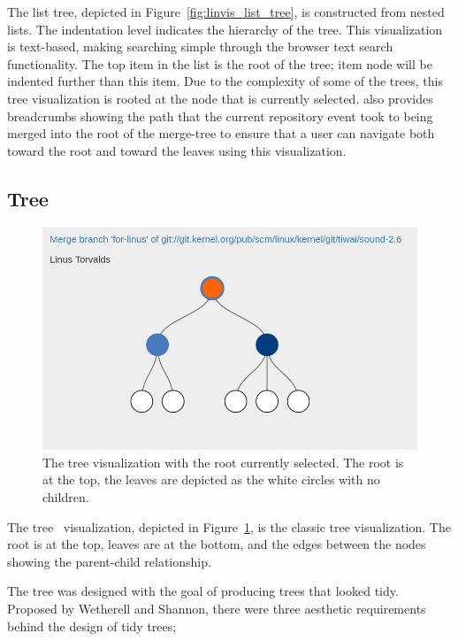 The list tree, depicted in Figure~\ref{fig:linvis_list_tree}, is
constructed from nested lists. The indentation level indicates the
hierarchy of the tree. This visualization is text-based, making
searching simple through the browser text search functionality. The top
item in the list is the root of the tree; item node will be indented
further than this item. Due to the complexity of some of the trees, this
tree visualization is rooted at the node that is currently selected.
\tool{} also provides breadcrumbs showing the path that the current
repository event took to being merged into the root of the merge-tree to
ensure that a user can navigate both toward the root and toward the
leaves using this visualization.

\subsection{\rt{} Tree}
\label{sub:rt_tree}

\begin{figure}[htpb]
  \centering
  \includegraphics[width=0.9\linewidth]{Figures/Linvis/linvis_reingold_tree.png}
  \caption{The \rt{} tree visualization with the root currently
    selected. The root is at the top, the leaves are depicted as the
    white circles with no children.}
  \label{fig:linvis_reingold_tree}
\end{figure}

The \rt{} tree~\cite{Reingold1981} visualization, depicted in
Figure~\ref{fig:linvis_reingold_tree}, is the classic tree
visualization. The root is at the top, leaves are at the bottom, and the
edges between the nodes showing the parent-child relationship.

The \rt{} tree was designed with the goal of producing trees that looked
tidy. Proposed by Wetherell and Shannon\cite{Wetherell1979}, there were
three aesthetic requirements behind the design of tidy trees;

